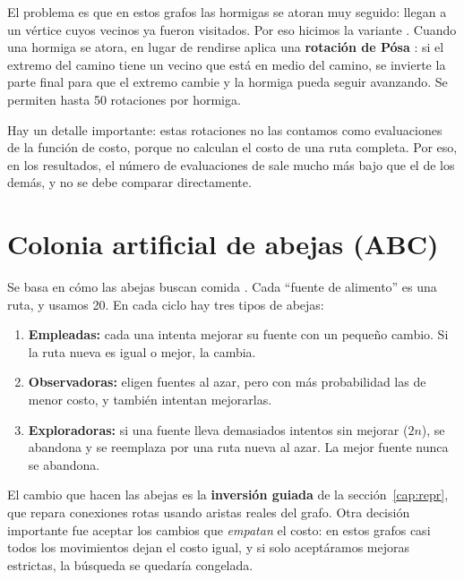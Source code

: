 El problema es que en estos grafos las hormigas se atoran muy seguido: llegan a un vértice cuyos
vecinos ya fueron visitados. Por eso hicimos la variante . Cuando una hormiga se
atora, en lugar de rendirse aplica una \textbf{rotación de Pósa} \cite{posa1976}: si el extremo
del camino tiene un vecino que está en medio del camino, se invierte la parte final para que el
extremo cambie y la hormiga pueda seguir avanzando. Se permiten hasta 50 rotaciones por hormiga.

Hay un detalle importante: estas rotaciones no las contamos como evaluaciones de la función de
costo, porque no calculan el costo de una ruta completa. Por eso, en los resultados, el número de
evaluaciones de  sale mucho más bajo que el de los demás, y no se debe comparar
directamente.

\section{Colonia artificial de abejas (ABC)}
\label{sec:abc}
Se basa en cómo las abejas buscan comida \cite{abc7,abc8}. Cada ``fuente de alimento'' es una ruta, y
usamos 20. En cada ciclo hay tres tipos de abejas:
\begin{enumerate}
  \item \textbf{Empleadas:} cada una intenta mejorar su fuente con un pequeño cambio. Si la ruta
        nueva es igual o mejor, la cambia.
  \item \textbf{Observadoras:} eligen fuentes al azar, pero con más probabilidad las de menor
        costo, y también intentan mejorarlas.
  \item \textbf{Exploradoras:} si una fuente lleva demasiados intentos sin mejorar ($2n$), se
        abandona y se reemplaza por una ruta nueva al azar. La mejor fuente nunca se abandona.
\end{enumerate}
El cambio que hacen las abejas es la \textbf{inversión guiada} de la sección~\ref{cap:repr}, que
repara conexiones rotas usando aristas reales del grafo. Otra decisión importante fue aceptar
los cambios que \emph{empatan} el costo: en estos grafos casi todos los movimientos dejan el
costo igual, y si solo aceptáramos mejoras estrictas, la búsqueda se quedaría congelada.

